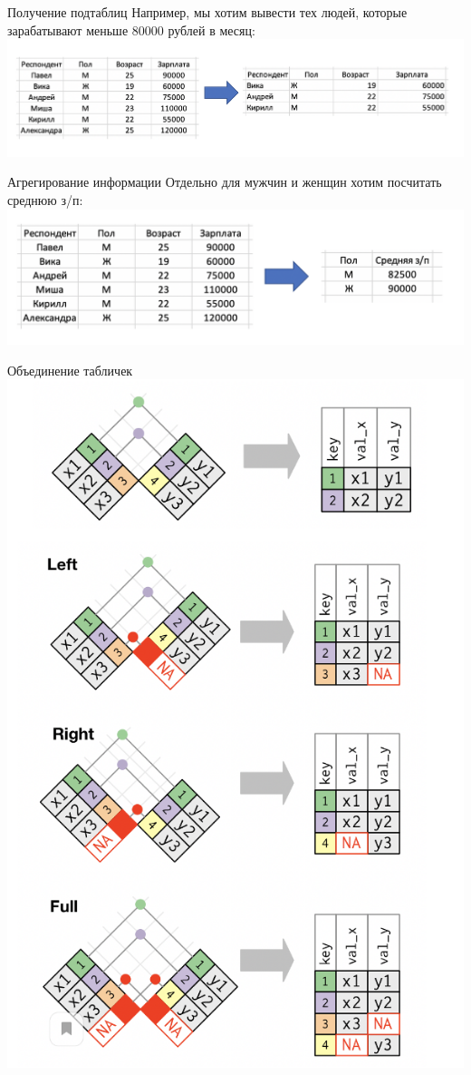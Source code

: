 \documentclass[notes,12pt, aspectratio=169]{beamer}
\begin{document}
\begin{frame}{Получение подтаблиц}
	Например, мы хотим вывести тех людей, которые зарабатывают меньше 80000 рублей в месяц:
	\centering \includegraphics[scale = 0.5]{ris9.png}
\end{frame}

\begin{frame}{Агрегирование информации}
	Отдельно для мужчин и женщин хотим посчитать среднюю з/п:
	\centering \includegraphics[scale = 0.5]{ris10.png}
\end{frame}

\begin{frame}{Объединение табличек}
	\centering \includegraphics[scale = 0.5]{ris11.png}
\end{frame}
\end{document}
